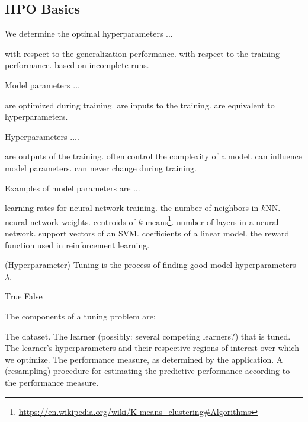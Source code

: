 \documentclass{exam}
\begin{document}
\begin{questions}
		\section{HPO Basics}
		\question We determine the optimal hyperparameters ...
		\begin{choices}
			\choice with respect to the generalization performance. %
			\choice with respect to the training performance.
			\choice based on incomplete runs.
		\end{choices}
		
		\question Model parameters ...
		\begin{choices}
			\choice are optimized during training. %
			\choice are inputs to the training.
			\choice are equivalent to hyperparameters.
		\end{choices}
		
		\question Hyperparameters ....
		\begin{choices}
			\choice are outputs of the training.
			\choice often control the complexity of a model. %
			\choice can influence model parameters. %
			\choice can never change during training.
		\end{choices}
		
		\question Examples of model parameters are ...
		\begin{choices}
			\choice learning rates for neural network training.
			\choice the number of neighbors in $k$NN.
			\choice neural network weights. %
			\choice centroids of $k$-means\footnote{\url{https://en.wikipedia.org/wiki/K-means\_clustering\#Algorithms}}. %
			\choice number of layers in a neural network.
			\choice support vectors of an SVM. %
			\choice coefficients of a linear model. %
			\choice the reward function used in reinforcement learning.
		\end{choices}
		
		\question (Hyperparameter) Tuning is the process of finding good model hyperparameters $\lambda$.
		\begin{choices}
			\choice True %
			\choice False
		\end{choices}
		
		\question The components of a tuning problem are:  %
		\begin{choices}
			\choice The dataset.
			\choice The learner (possibly: several competing learners?) that is tuned.
			\choice The learner’s hyperparameters and their respective regions-of-interest over which we optimize.
			\choice The performance measure, as determined by the application.
			\choice A (resampling) procedure for estimating the predictive performance according to the
			performance measure.
		\end{choices}
		

\end{questions}
\end{document}
